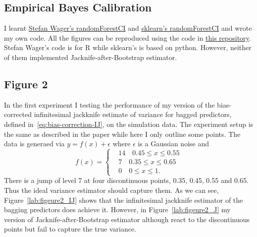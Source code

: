 \documentclass[11pt]{article}
\begin{document}
\subsection{Empirical Bayes Calibration}
I learnt \href{https://github.com/swager/randomForestCI}{Stefan Wager's randomForestCI} and \href{https://github.com/scikit-learn-contrib/forest-confidence-interval}{sklearn's randomForestCI} and wrote my own code.
All the figures can be reproduced using the code in \href{https://github.com/liangzp/MATH-5472}{this repository}.
Stefan Wager's code is for R while sklearn's is based on python. 
However, neither of them implemented Jacknife-after-Bootstrap estimator.

\subsection{Figure 2}
In the first experiment I testing the performance of my version of the bias-corrected infinitesimal jackknife estimate of variance for bagged predictors, defined in~\ref{eq:bias-correction-IJ}, on the simulation data.
The experiment setup is the same as described in the paper while here I only outline some points.
The data is generaed via $y=f(x)+\epsilon$ where $\epsilon$ is a Gaussian noise and 
\begin{equation}
	f(x)=\left\{
	\begin{aligned}
	&14 \quad 0.45 \le x\le 0.55\\
	&7 \quad 0.35 \le x\le 0.65\\
	&0 \quad 0\le x\le 1.
	\end{aligned}
	\right
	.
\end{equation}
There is a jump of level 7 at four discontinuous points, 0.35, 0.45, 0.55 and 0.65. 
Thus the ideal variance estimator should capture them.
As we can see, Figure~\ref{lab:figeure2_IJ} shows that the infinitesimal jackknife estimator of the bagging predictors does achieve it.
However, in Figure~\ref{lab:figeure2_J} my version of Jacknife-after-Bootstrap estimator although react to the discontinuous points but fail to capture the true variance.
\end{document}

